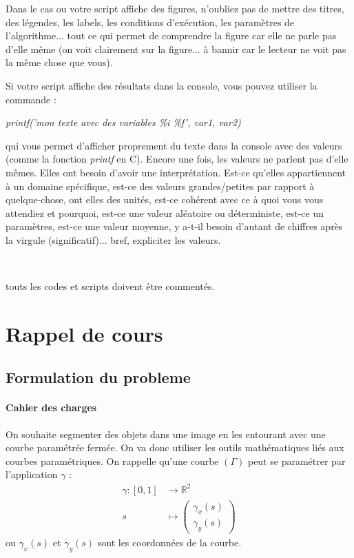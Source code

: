 \documentclass[10pt,a4paper]{article}
\begin{document}
Dans le cas ou votre script affiche des figures,  n'oubliez pas de mettre des titres, des l\'{e}gendes, les labels, les conditions d'ex\'{e}cution, les param\`{e}tres de l'algorithme... tout ce qui permet de comprendre la figure car elle ne parle pas d'elle m\^{e}me (on voit clairement sur la figure... \`{a} bannir car le lecteur ne voit pas la m\^{e}me chose que vous).

Si votre script affiche des r\'{e}sultats dans la console, vous pouvez utiliser la commande :
\begin{center}
 \textit{printf('mon texte avec des variables \%i \%f', var1, var2)}
\end{center}
qui vous permet d'afficher proprement du texte dans la console avec des valeurs (comme la fonction \textit{printf} en C). Encore une fois, les valeurs ne parlent pas d'elle m\^{e}mes. Elles ont besoin d'avoir une interpr\'{e}tation. Est-ce qu'elles appartiennent \`{a} un domaine sp\'{e}cifique, est-ce des valeurs grandes/petites par rapport \`{a} quelque-chose, ont elles des unit\'{e}s, est-ce coh\'{e}rent avec ce \`{a} quoi vous vous attendiez et pourquoi, est-ce une valeur al\'{e}atoire ou d\'{e}terministe, est-ce un param\`{e}tres, est-ce une valeur moyenne, y a-t-il besoin d'autant de chiffres apr\`{e}s la virgule (significatif)... bref, expliciter les valeurs.

~


 touts les codes et scripts doivent \^{e}tre comment\'{e}s.




\section{Rappel de cours}
\subsection{Formulation du probleme}
\paragraph{Cahier des charges} On souhaite segmenter des objets dans une image en les entourant avec une courbe param\'{e}tr\'{e}e ferm\'{e}e. On va donc utiliser les outils math\'{e}matiques li\'{e}s aux courbes param\'{e}triques. On rappelle qu'une courbe $(\Gamma)$ peut se param\'{e}trer par l'application $\gamma$ :
\begin{align*}
	\gamma :  [0,1] &\rightarrow \mathbb{R}^2\\
			s &\mapsto \begin{pmatrix}\gamma_x(s)\\ \gamma_y(s)\end{pmatrix}
\end{align*}
ou $\gamma_x(s)$ et $\gamma_y(s)$ sont les coordonn\'{e}es de la courbe. 
\end{document}

